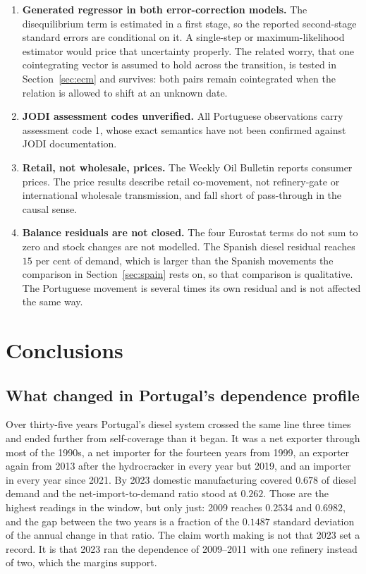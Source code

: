 \documentclass[11pt,a4paper]{article}
\begin{document}
\begin{enumerate}
longer post period is the only thing that would settle it. \item \textbf{Generated regressor in
both error-correction models.} The disequilibrium term is estimated in a first stage, so the
reported second-stage standard errors are conditional on it. A single-step or maximum-likelihood
estimator would price that uncertainty properly. The related worry, that one cointegrating
vector is assumed to hold across the transition, is tested in Section~\ref{sec:ecm} and
survives: both pairs remain cointegrated when the relation is allowed to shift at an unknown
date. \item \textbf{JODI assessment codes unverified.} All Portuguese observations carry
assessment code 1, whose exact semantics have not been confirmed against JODI documentation.
\item \textbf{Retail, not wholesale, prices.} The Weekly Oil Bulletin reports consumer prices.
The price results describe retail co-movement, not refinery-gate or international wholesale
transmission, and fall short of pass-through in the causal sense. \item \textbf{Balance
residuals are not closed.} The four Eurostat terms do not sum to zero and stock changes are not
modelled. The Spanish diesel residual reaches $15$ per cent of demand, which is larger than the
Spanish movements the comparison in Section~\ref{sec:spain} rests on, so that comparison is
qualitative. The Portuguese movement is several times its own residual and is not affected the
same way. \end{enumerate}

\section{Conclusions}
\label{sec:conclusions}

\subsection{What changed in Portugal's dependence profile}

Over thirty-five years Portugal's diesel system crossed the same line three times and ended
further from self-coverage than it began. It was a net exporter through most of the 1990s, a net
importer for the fourteen years from 1999, an exporter again from 2013 after the hydrocracker in
every year but 2019, and an importer in every year since 2021. By 2023 domestic manufacturing
covered $0.678$ of diesel demand and the net-import-to-demand ratio stood at $0.262$. Those are
the highest readings in the window, but only just: 2009 reaches $0.2534$ and $0.6982$, and the
gap between the two years is a fraction of the $0.1487$ standard deviation of the annual change
in that ratio. The claim worth making is not that 2023 set a record. It is that 2023 ran the
dependence of 2009--2011 with one refinery instead of two, which the margins support.
\end{document}
